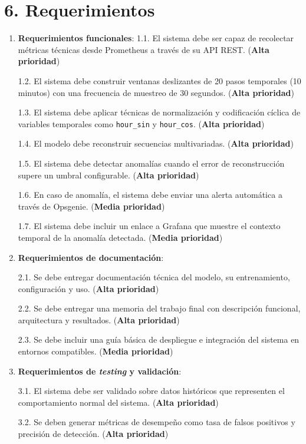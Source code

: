 \documentclass[
11pt, %
]{charter}
\begin{document}
\section{6. Requerimientos}
\label{sec:requerimientos}


\begin{enumerate}
    \item \textbf{Requerimientos funcionales}:
 1.1. El sistema debe ser capaz de recolectar métricas técnicas desde Prometheus a través de su API REST. (\textbf{Alta prioridad})

 1.2. El sistema debe construir ventanas deslizantes de 20 pasos temporales (10 minutos) con una frecuencia de muestreo de 30 segundos. (\textbf{Alta prioridad})

 1.3. El sistema debe aplicar técnicas de normalización y codificación cíclica de variables temporales como \verb|hour_sin| y \verb|hour_cos|. (\textbf{Alta prioridad})

 1.4. El modelo debe reconstruir secuencias multivariadas. (\textbf{Alta prioridad})

 1.5. El sistema debe detectar anomalías cuando el error de reconstrucción supere un umbral configurable. (\textbf{Alta prioridad})

 1.6. En caso de anomalía, el sistema debe enviar una alerta automática a través de Opsgenie. (\textbf{Media prioridad})

 1.7. El sistema debe incluir un enlace a Grafana que muestre el contexto temporal de la anomalía detectada. (\textbf{Media prioridad})
    \item \textbf{Requerimientos de documentación}:

 2.1. Se debe entregar documentación técnica del modelo, su entrenamiento, configuración y uso. (\textbf{Alta prioridad})

 2.2. Se debe entregar una memoria del trabajo final con descripción funcional, arquitectura y resultados. (\textbf{Alta prioridad})

 2.3. Se debe incluir una guía básica de despliegue e integración del sistema en entornos compatibles. (\textbf{Media prioridad})
    \item \textbf{Requerimientos de \textit{testing} y validación}:

 3.1. El sistema debe ser validado sobre datos históricos que representen el comportamiento normal del sistema. (\textbf{Alta prioridad})

 3.2. Se deben generar métricas de desempeño como tasa de falsos positivos y precisión de detección. (\textbf{Alta prioridad})


\end{enumerate}
\end{document}
